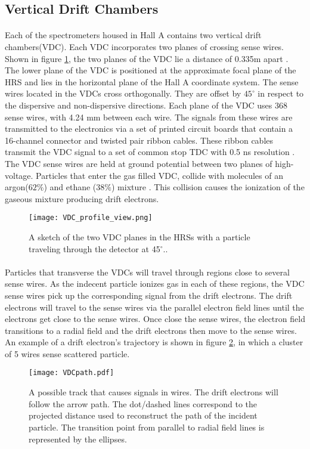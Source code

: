 	\subsection{Vertical Drift Chambers}\label{sec:vdc}
	\paragraph{}Each of the spectrometers housed in Hall A contains two vertical drift chambers(VDC). Each VDC incorporates two planes of crossing sense wires. Shown in figure \ref{VDC_profile}, the two planes of the VDC lie a distance of 0.335m apart \cite{drift}. The lower plane of the VDC is positioned at the approximate focal plane of the HRS and lies in the horizontal plane of the Hall A coordinate system. The sense wires located in the VDCs cross orthogonally. They are offset by $45^\circ$ in respect to the dispersive and non-dispersive directions. Each plane of the VDC uses 368 sense wires, with 4.24 mm between each wire. The signals from these wires are transmitted to the electronics via a set of printed circuit boards that contain a 16-channel connector and twisted pair ribbon cables. These ribbon cables transmit the VDC signal to a set of common stop TDC with 0.5 ns resolution \cite{drift}. The VDC sense wires are held at ground potential between two planes of high-voltage. Particles that enter the gas filled VDC, collide with molecules of an argon($62\%$) and ethane ($38\%$) mixture \cite{HallA}. This collision causes the ionization of the gaseous mixture producing drift electrons.
	\begin{figure}
		\centering
		\texttt{[image: VDC\_profile\_view.png]}
		\caption{A sketch of the two VDC planes in the HRSs with a particle traveling through the detector at 45$^\circ$.\cite{drift}.
			\label{VDC_profile}}
	\end{figure}
	\paragraph{} Particles that transverse the VDCs will travel through regions close to several sense wires. As the indecent particle ionizes gas in each of these regions, the VDC sense wires pick up the corresponding signal from the drift electrons. The drift electrons will travel to the sense wires via the parallel electron field lines until the electrons get close to the sense wires. Once close the sense wires, the electron field transitions to a radial field and the drift electrons then move to the sense wires. An example of a drift electron's trajectory  is shown in figure \ref{vdcpath}, in which a cluster of 5 wires sense scattered particle.
	\begin{figure}[t]
		\centering
		\texttt{[image: VDCpath.pdf]}
		\caption{A possible track that causes signals in  wires. The drift electrons will follow the arrow path. The dot/dashed lines correspond to the projected distance used to reconstruct the path of the incident particle. The transition point from parallel to radial field lines is represented by the ellipses. \cite{drift} }
		\label{vdcpath}
	\end{figure}

